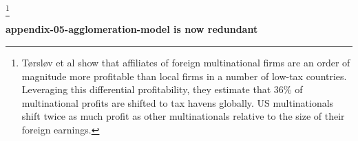\begin{enumerate}
\begin{quotation}



\end{quotation}

\end{enumerate}



\footnote{Tørsløv et al \cite{torslovMissingProfitsNations2023} show that affiliates of foreign multinational firms are an order of magnitude more profitable than local firms in a number of low-tax countries. Leveraging this differential profitability, they estimate that 36\% of multinational profits are shifted to tax havens globally. US multinationals shift twice as much profit as other multinationals relative to the size of their foreign earnings.}


\textbf{appendix-05-agglomeration-model is now redundant} %

